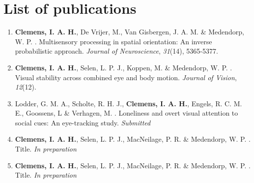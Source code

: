 \clearpage
\pagestyle{empty}

\chapter*{List of publications}
{}

\begin{enumerate}

\item \textbf{Clemens, I. A. H.}, De Vrijer, M., Van Gisbergen, J. A. M. \& Medendorp, W. P.
\citeyear{clemens2011}. Multisensory processing in spatial orientation: An inverse probabilistic approach. \textit{Journal of Neuroscience}, \textit{31}(14), 5365-5377.

\item \textbf{Clemens, I. A. H.}, Selen, L. P. J., Koppen, M. \& Medendorp, W. P. \citeyear{clemens2012}. Visual stability across combined eye and body motion. \textit{Journal of Vision}, \textit{12}(12).

\item Lodder, G. M. A., Scholte, R. H. J., \textbf{Clemens, I. A. H.}, Engels, R. C. M. E., Goossens, L \& Verhagen, M. \citeyear{lodder2015}. Loneliness and overt visual attention to social cues: An eye-tracking study. \textit{Submitted}

\item \textbf{Clemens, I. A. H.}, Selen, L. P. J., MacNeilage, P. R. \& Medendorp, W. P. \citeyear{clemens2015a}. Title. \textit{In preparation}

\item \textbf{Clemens, I. A. H.}, Selen, L. P. J., MacNeilage, P. R. \& Medendorp, W. P. \citeyear{clemens2015b}. Title. \textit{In preparation}

\end{enumerate}
